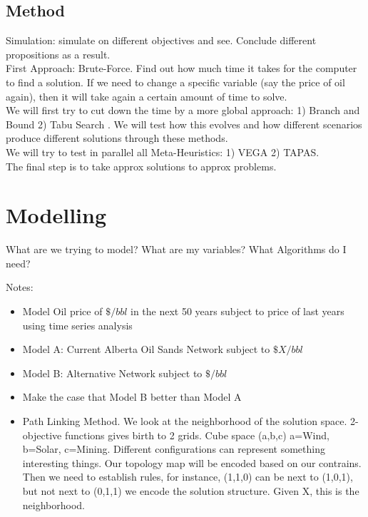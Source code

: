 \documentclass[12pt]{article}
\begin{document}
\subsection{Method}
Simulation: simulate on different objectives and see. Conclude different propositions as a result. \\

First Approach: Brute-Force. Find out how much time it takes for the computer to find a solution. If we need to change a specific variable (say the price of oil again), then it will take again a certain amount of time to solve. \\

We will first try to cut down the time by a more global approach: 1) Branch and Bound 2) Tabu Search . We will test how this evolves and how different scenarios produce different solutions through these methods.  \\

We will try to test in parallel all Meta-Heuristics: 1) VEGA 2) TAPAS. \\

The final step is to take approx solutions to approx problems. \\

\section{Modelling}

What are we trying to model? What are my variables? What Algorithms do I need?

Notes:
\begin{itemize}
\item Model Oil price of $\$/bbl$ in the next 50 years subject to price of last years using time series analysis
\item Model A: Current Alberta Oil Sands Network subject to $\$X/bbl$
\item Model B: Alternative Network subject to $\$/bbl$
\item Make the case that Model B better than Model A
\item Path Linking Method. We look at the neighborhood of the solution space. 2-objective functions gives birth to 2 grids. Cube space (a,b,c) a=Wind, b=Solar, c=Mining. Different configurations can represent something interesting things. Our topology map will be encoded based on our contrains. Then we need to establish rules, for instance, (1,1,0) can be next to (1,0,1), but not next to (0,1,1) we encode the solution structure. Given X, this is the neighborhood.  
\end{itemize}
\end{document}
